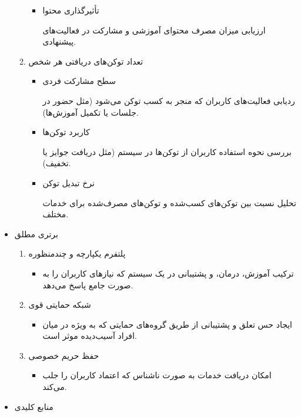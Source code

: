 \documentclass[dvipsnames, svgnames, x11names, 11pt]{article}
\begin{document}
\begin{itemize}
\begin{enumerate}
\begin{itemize}
\item 
تأثیرگذاری محتوا

ارزیابی میزان مصرف محتوای آموزشی و مشارکت در فعالیت‌های پیشنهادی.  
\end{itemize}

\item 
تعداد توکن‌های دریافتی هر شخص 
\begin{itemize} 
\item 
سطح مشارکت فردی

ردیابی فعالیت‌های کاربران که منجر به کسب توکن می‌شود (مثل حضور در جلسات یا تکمیل آموزش‌ها).  

\item 
کاربرد توکن‌ها

بررسی نحوه استفاده کاربران از توکن‌ها در سیستم (مثل دریافت جوایز یا تخفیف).  

\item 
نرخ تبدیل توکن

تحلیل نسبت بین توکن‌های کسب‌شده و توکن‌های مصرف‌شده برای خدمات مختلف.  
\end{itemize}
\end{enumerate}

\item
برتری مطلق

\begin{enumerate}
\item 
پلتفرم یکپارچه و چندمنظوره
\begin{itemize}
\item 
ترکیب آموزش، درمان، و پشتیبانی در یک سیستم که نیازهای کاربران را به صورت جامع پاسخ می‌دهد.
\end{itemize}

\item 
شبکه حمایتی قوی

\begin{itemize}
\item
ایجاد حس تعلق و پشتیبانی از طریق گروه‌های حمایتی که به ویژه در میان افراد آسیب‌دیده موثر است.
\end{itemize}

\item 
حفظ حریم خصوصی

\begin{itemize}
\item
امکان دریافت خدمات به صورت ناشناس که اعتماد کاربران را جلب می‌کند.
\end{itemize}
\end{enumerate}

\item 
منابع کلیدی


\end{itemize}
\end{document}
